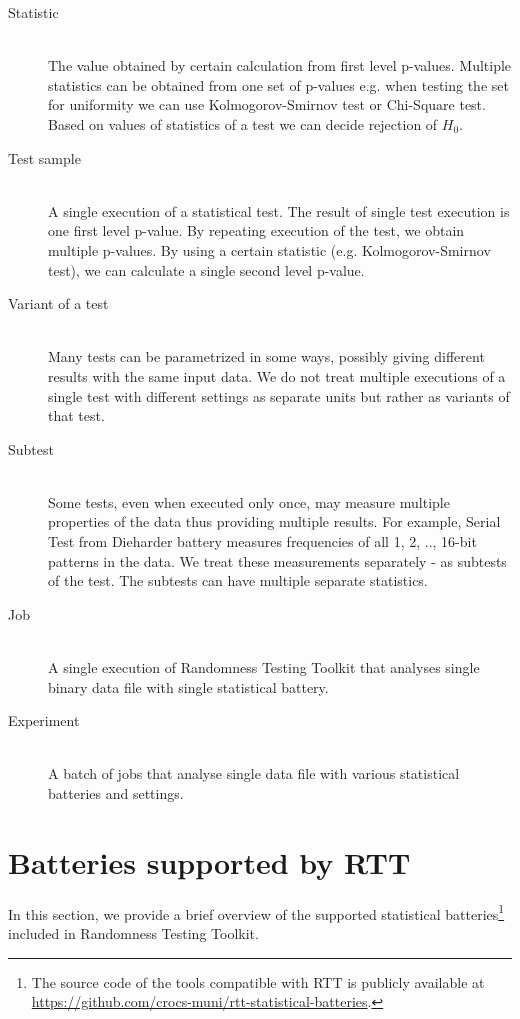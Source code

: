 \documentclass[
	digital,    %
	oneside,    %
	color,
	11pt,
	nocover,
	notable,
	nolof,
	nolot,
]{fithesis3}
\theoremstyle{definition}
\theoremstyle{remark}
\begin{document}
\begin{description}
\pagebreak

\item[Statistic] \hfill \\
The value obtained by certain calculation from first level p-values. Multiple statistics can be obtained from one set of p-values e.g. when testing the set for uniformity we can use Kolmogorov-Smirnov test or Chi-Square test. Based on values of statistics of a test we can decide rejection of $H_0$.

\item[Test sample] \hfill \\
A single execution of a statistical test. The result of single test execution is one first level p-value. By repeating execution of the test, we obtain multiple p-values. By using a certain statistic (e.g. Kolmogorov-Smirnov test), we can calculate a single second level p-value.

\item[Variant of a test] \hfill \\
Many tests can be parametrized in some ways, possibly giving different results with the same input data. We do not treat multiple executions of a single test with different settings as separate units but rather as variants of that test.

\item[Subtest] \hfill \\
Some tests, even when executed only once, may measure multiple properties of the data thus providing multiple results. For example, Serial Test from Dieharder battery measures frequencies of all 1, 2, .., 16-bit patterns in the data. We treat these measurements separately - as subtests of the test. The subtests can have multiple separate statistics.

\item[Job] \hfill \\
A single execution of Randomness Testing Toolkit that analyses single binary data file with single statistical battery.

\item[Experiment] \hfill \\
A batch of jobs that analyse single data file with various statistical batteries and settings.

\end{description}

\section{Batteries supported by RTT}
In this section, we provide a brief overview of the supported statistical batteries\footnote{The source code of the tools compatible with RTT is publicly available at \url{https://github.com/crocs-muni/rtt-statistical-batteries}.} included in Randomness Testing Toolkit.
\end{document}
